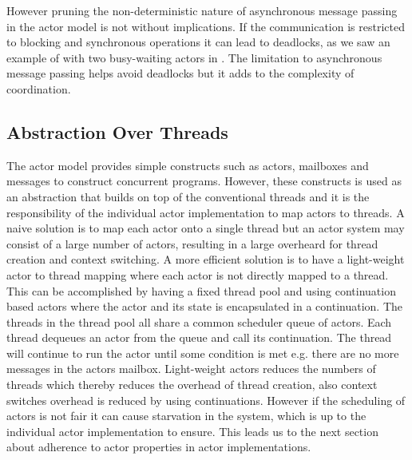 However pruning the non-deterministic nature of asynchronous message passing in the actor model is not without implications. If the communication is restricted to blocking and synchronous operations it can lead to deadlocks, as we saw an example of with two busy-waiting actors in . The limitation to asynchronous message passing helps avoid deadlocks but it adds to the complexity of coordination\cite[p. 311]{tasharofi2013scala}.

\subsection{Abstraction Over Threads}\label{ssec:abstraction_over_threads}
The actor model provides simple constructs such as actors, mailboxes and messages to construct concurrent programs. However, these constructs is used as an abstraction that builds on top of the conventional threads and it is the responsibility of the individual actor implementation to map actors to threads. A naive solution is to map each actor onto a single thread but an actor system may consist of a large number of actors, resulting in a large overheard for thread creation and context switching\cite[p. 7]{karmani2009actor}. A more efficient solution is to have a light-weight actor to thread mapping where each actor is not directly mapped to a thread. This can be accomplished by having a fixed thread pool and using continuation based actors where the actor and its state is encapsulated in a continuation. The threads in the thread pool all share a common scheduler queue of actors. Each thread dequeues an actor from the queue and call its continuation. The thread will continue to run the actor until some condition is met e.g. there are no more messages in the actors mailbox. Light-weight actors reduces the numbers of threads which thereby reduces the overhead of thread creation, also context switches overhead is reduced by using continuations. However if the scheduling of actors is not fair it can cause starvation in the system, which is up to the individual actor implementation to ensure\cite[p. 7]{karmani2009actor}. This leads us to the next section about adherence to actor properties in actor implementations.

